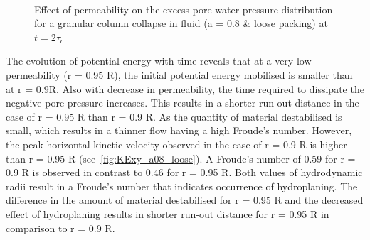 \begin{figure}
\centering
{}\\
\caption{Effect of permeability on the excess pore water pressure distribution 
for a granular column collapse in fluid (a = 0.8 \& loose packing) at $t = 
2\tau_c$}
\label{fig:Loose_PWP_flow}
\end{figure}

The evolution of potential energy with time reveals that at a very low 
permeability (r = 0.95 R), the initial potential energy mobilised is smaller 
than at r = 0.9R. Also with decrease in permeability, the time required to 
dissipate the negative pore pressure increases. This results in a shorter 
run-out distance in the case of r = 0.95 R than r = 0.9 R. As the quantity of 
material destabilised is small, which results in a thinner flow having a high 
Froude's number. However, the peak horizontal kinetic velocity observed in the 
case of r = 0.9 R is higher than r = 0.95 R (see~\cref{fig:KExy_a08_loose}).  A 
Froude's number of 0.59 for r = 0.9 R is observed in contrast to 0.46 for r = 
0.95 R. Both values of hydrodynamic radii result in a Froude's number that 
indicates occurrence of hydroplaning. The difference in the amount of material 
destabilised for r = 0.95 R and the decreased effect of hydroplaning results in 
shorter run-out distance for r = 0.95 R in comparison to r = 0.9 R. 


